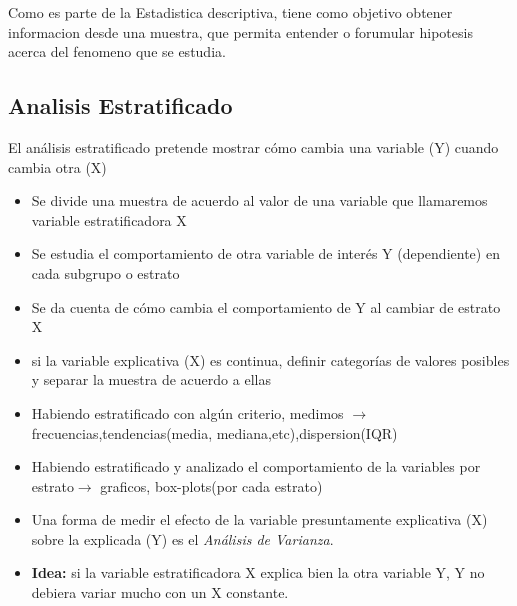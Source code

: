 Como es parte de la Estadistica descriptiva, tiene como objetivo obtener informacion desde una muestra,
que permita entender o forumular hipotesis acerca del fenomeno que se estudia.

\subsection{Analisis Estratificado}
	El análisis estratificado pretende mostrar cómo cambia una variable (Y) cuando cambia otra (X)
	\begin{itemize}
		\item Se divide una muestra de acuerdo al valor de una variable que llamaremos variable estratificadora X
		\item Se estudia el comportamiento de otra variable  de interés Y (dependiente) en cada subgrupo o estrato
		\item Se da cuenta de cómo cambia el comportamiento de Y al cambiar de estrato X
		\item si la variable explicativa (X) es continua, definir categorías de valores posibles y separar la muestra de acuerdo a ellas
		\item Habiendo estratificado con algún criterio, medimos $\rightarrow$ frecuencias,tendencias(media, mediana,etc),dispersion(IQR)
		\item Habiendo estratificado y analizado el comportamiento de la variables por estrato$\rightarrow$ graficos, box-plots(por cada estrato)
		\item Una forma de medir el efecto de la variable presuntamente explicativa (X) sobre la explicada (Y) es el \emph{An\'alisis de Varianza}.
		\item \textbf{Idea:} si la variable estratificadora X explica bien la otra variable Y, Y no debiera variar mucho con un X constante.
	\end{itemize}
